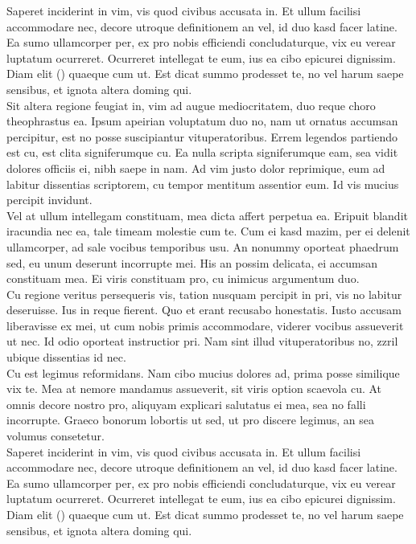 Saperet inciderint in vim, vis quod civibus accusata in. Et ullum facilisi accommodare nec, decore utroque definitionem an vel, id duo kasd facer latine. Ea sumo ullamcorper per, ex pro nobis efficiendi concludaturque, vix eu verear luptatum ocurreret. Ocurreret intellegat te eum, ius ea cibo epicurei dignissim. Diam elit \citeauthor{Bremner2009} (\citeyear{Bremner2009}) quaeque cum ut. Est dicat summo prodesset te, no vel harum saepe sensibus, et ignota altera doming qui.\\

Sit altera regione feugiat in, vim ad augue mediocritatem, duo reque choro theophrastus ea. Ipsum apeirian voluptatum duo no, nam ut ornatus accumsan percipitur, est no posse suscipiantur vituperatoribus. Errem legendos partiendo est cu, est clita signiferumque cu. Ea nulla scripta signiferumque eam, sea vidit dolores officiis ei, nibh saepe in nam. Ad vim justo dolor reprimique, eum ad labitur dissentias scriptorem, cu tempor mentitum assentior eum. Id vis mucius percipit invidunt.\\

Vel at ullum intellegam constituam, mea dicta affert perpetua ea. Eripuit blandit iracundia nec ea, tale timeam molestie cum te. Cum ei kasd mazim, per ei delenit ullamcorper, ad sale vocibus temporibus usu. An nonummy oporteat phaedrum sed, eu unum deserunt incorrupte mei. His an possim delicata, ei accumsan constituam mea. Ei viris constituam pro, cu inimicus argumentum duo.\\

Cu regione veritus persequeris vis, tation nusquam percipit in pri, vis no labitur deseruisse. Ius in reque fierent. Quo et erant recusabo honestatis. Iusto accusam liberavisse ex mei, ut cum nobis primis accommodare, viderer vocibus assueverit ut nec. Id odio oporteat instructior pri. Nam sint illud vituperatoribus no, zzril ubique dissentias id nec.\\

Cu est legimus reformidans. Nam cibo mucius dolores ad, prima posse similique vix te. Mea at nemore mandamus assueverit, sit viris option scaevola cu. At omnis decore nostro pro, aliquyam explicari salutatus ei mea, sea no falli incorrupte. Graeco bonorum lobortis ut sed, ut pro discere legimus, an sea volumus consetetur.\\

Saperet inciderint in vim, vis quod civibus accusata in. Et ullum facilisi accommodare nec, decore utroque definitionem an vel, id duo kasd facer latine. Ea sumo ullamcorper per, ex pro nobis efficiendi concludaturque, vix eu verear luptatum ocurreret. Ocurreret intellegat te eum, ius ea cibo epicurei dignissim. Diam elit \citeauthor{Bremner2009} (\citeyear{Bremner2009}) quaeque cum ut. Est dicat summo prodesset te, no vel harum saepe sensibus, et ignota altera doming qui.\\

